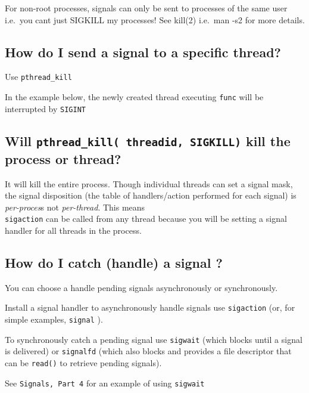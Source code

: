 For non-root processes, signals can only be sent to processes of the
same user i.e.~you cant just SIGKILL my processes! See kill(2) i.e.~man
-s2 for more details.

\subsection{How do I send a signal to a specific
thread?}\label{how-do-i-send-a-signal-to-a-specific-thread}

Use \texttt{pthread\_kill}

\begin{Shaded}
\begin{Highlighting}[]
  
\end{Highlighting}
\end{Shaded}

In the example below, the newly created thread executing \texttt{func}
will be interrupted by \texttt{SIGINT}

\begin{Shaded}
\begin{Highlighting}[]
\end{Highlighting}
\end{Shaded}

\subsection{\texorpdfstring{Will
\texttt{pthread\_kill(\ threadid,\ SIGKILL)} kill the process or
thread?}{Will pthread\_kill( threadid, SIGKILL) kill the process or thread?}}\label{will-pthreadux5fkill-threadid-sigkill-kill-the-process-or-thread}

It will kill the entire process. Though individual threads can set a
signal mask, the signal disposition (the table of handlers/action
performed for each signal) is \emph{per-proces}s not \emph{per-thread}.
This means\\\texttt{sigaction} can be called from any thread because you
will be setting a signal handler for all threads in the process.

\subsection{How do I catch (handle) a signal
?}\label{how-do-i-catch-handle-a-signal}

You can choose a handle pending signals asynchronously or synchronously.

Install a signal handler to asynchronously handle signals use
\texttt{sigaction} (or, for simple examples, \texttt{signal} ).

To synchronously catch a pending signal use \texttt{sigwait} (which
blocks until a signal is delivered) or \texttt{signalfd} (which also
blocks and provides a file descriptor that can be \texttt{read()} to
retrieve pending signals).

See \texttt{Signals,\ Part\ 4} for an example of using \texttt{sigwait}
